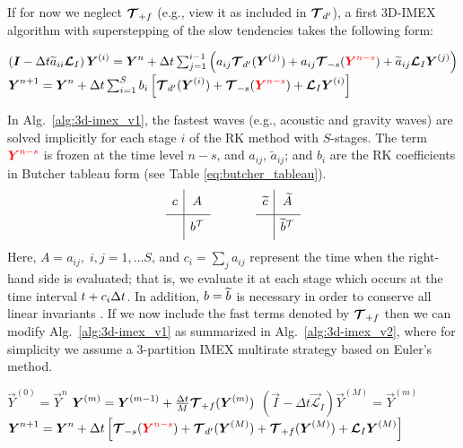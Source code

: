 \documentclass{report}
\numberwithin{equation}{section}
\begin{document}
If for now we neglect $\boldsymbol{{\mathcal{T}}}_{+f}$ (e.g., view it as included in  $\boldsymbol{{\mathcal{T}}}_{d'}$), a first 3D-IMEX algorithm with superstepping of the slow tendencies takes the following form:
\begin{algorithm}
\label{alg:3d-imex_v1}
\begin{algorithmic}
\State
{}
\State $\left( \boldsymbol{{I}} - \Delta t \widetilde{a}_{ii} \boldsymbol{{\mathcal{L}}}_I \right) \boldsymbol{{Y}}^{(i)}=\boldsymbol{{Y}}^{n} + \Delta t \sum_{j=1}^{i-1} \left( a_{ij} \boldsymbol{{\mathcal{T}}}_{d'}(\boldsymbol{{Y}}^{(j)}) + a_{ij} \boldsymbol{{\mathcal{T}}}_{-s}(\textcolor{red}{\boldsymbol{{Y}}^{n-s}})
+ \widetilde{a}_{ij} \boldsymbol{{\mathcal{L}}}_I \boldsymbol{{Y}}^{(j)} \right)$ 
\EndFor %
\State $\boldsymbol{{Y}}^{n+1}=\boldsymbol{{Y}}^{n} + \Delta t \sum_{i=1}^{S} b_{i} \left[ \boldsymbol{{\mathcal{T}}}_{d'}(\boldsymbol{{Y}}^{(i)}) + \boldsymbol{{\mathcal{T}}}_{-s}(\textcolor{red}{\boldsymbol{{Y}}^{n-s}})
+ \boldsymbol{{\mathcal{L}}}_I \boldsymbol{{Y}}^{(i)} \right]$
\EndFunction
\end{algorithmic}
\end{algorithm}
In Alg.\ \ref{alg:3d-imex_v1}, the fastest waves (e.g., acoustic and gravity waves) are solved implicitly for each stage $i$ of the RK method with $S$-stages. The term $\textcolor{red}{\boldsymbol{{Y}}^{n-s}}$ is frozen at the time level $n-s$, and $a_{ij}$, $\widetilde{a}_{ij}$; and $b_i$ are the RK coefficients in Butcher tableau form (see Table \ref{eq:butcher_tableau}).
\begin{equation}
\begin{array}{c|c}
\ST c&A\\
\hline
\ST  & b\transpose
\end{array}
\hspace{0.5in}
\begin{array}{c|c}
\ST \wt{c} & \wt{A} \\
\hline
\ST  & \wt{b} \transpose
\end{array}
\label{eq:butcher_tableau}
\end{equation}
Here, $A=a_{ij}, \; i,j=1,\ldots S$, and $c_i=\sum_{j} a_{ij}$ represent the time when the right-hand side is evaluated; that is, we evaluate it at each stage which occurs at the time interval $t+c_i {\Delta t}$.
In addition, $b=\widetilde{b}$ is necessary in order to conserve all linear invariants \citep{giraldo:2013}. If we now include the fast terms denoted by $\boldsymbol{{\mathcal{T}}}_{+f}$ then we can modify Alg.\ \ref{alg:3d-imex_v1} as summarized in Alg.\ \ref{alg:3d-imex_v2}, where for simplicity we assume a 3-partition IMEX multirate strategy based on Euler's method.
\begin{algorithm}
\label{alg:3d-imex_v2}
\begin{algorithmic}
\State
{}
\State $\vec{Y}^{(0)}=\vec{Y}^{n}$
\State $\boldsymbol{{Y}}^{(m)}=\boldsymbol{{Y}}^{(m-1)} + \frac{\Delta t}{M} \boldsymbol{{\mathcal{T}}}_{+f}(\boldsymbol{{Y}}^{(m)})$
\EndFor %
\State $\left( \vec{I} - \Delta t \vec{\mathcal{L}}_I \right) \vec{Y}^{(M)}=\vec{Y}^{(m)}$
\State $\boldsymbol{{Y}}^{n+1}=\boldsymbol{{Y}}^{n} + \Delta t \left[ \boldsymbol{{\mathcal{T}}}_{-s}(\textcolor{red}{\boldsymbol{{Y}}^{n-s}}) + \boldsymbol{{\mathcal{T}}}_{d'}(\boldsymbol{{Y}}^{(M)}) + 
\boldsymbol{{\mathcal{T}}}_{+f}(\boldsymbol{{Y}}^{(M)}) + 
\boldsymbol{{\mathcal{L}}}_I \boldsymbol{{Y}}^{(M)} \right]$
\EndFunction
\end{algorithmic}
\end{algorithm}
\end{document}
